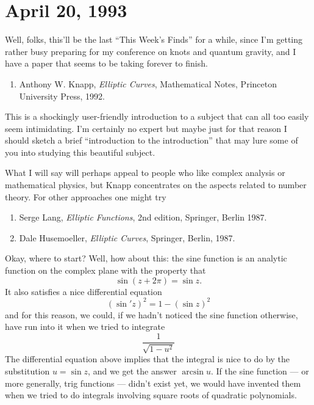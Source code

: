 \documentclass[12pt]{article}
\def\tightlist{}
\begin{document}
\hypertarget{week13}{%
\section{April 20, 1993}\label{week13}}

Well, folks, this'll be the last ``This Week's Finds'' for a while,
since I'm getting rather busy preparing for my conference on knots and
quantum gravity, and I have a paper that seems to be taking forever to
finish.

\begin{enumerate}
\def\labelenumi{\arabic{enumi})}
\tightlist
\item
  Anthony W. Knapp, \emph{Elliptic Curves}, Mathematical Notes,
  Princeton University Press, 1992.
\end{enumerate}

This is a shockingly user-friendly introduction to a subject that can
all too easily seem intimidating. I'm certainly no expert but maybe just
for that reason I should sketch a brief ``introduction to the
introduction'' that may lure some of you into studying this beautiful
subject.

What I will say will perhaps appeal to people who like complex analysis
or mathematical physics, but Knapp concentrates on the aspects related
to number theory. For other approaches one might try

\begin{enumerate}
\def\labelenumi{\arabic{enumi})}
\setcounter{enumi}{1}
\item
  Serge Lang, \emph{Elliptic Functions}, 2nd edition, Springer, Berlin
  1987.
\item
  Dale Husemoeller, \emph{Elliptic Curves}, Springer, Berlin, 1987.
\end{enumerate}

Okay, where to start? Well, how about this: the sine function is an
analytic function on the complex plane with the property that
\[\sin(z + 2\pi) = \sin z.\] It also satisfies a nice differential
equation \[(\sin' z)^2 = 1 -(\sin z)^2\] and for this reason, we could,
if we hadn't noticed the sine function otherwise, have run into it when
we tried to integrate
 \[\frac{1}{\sqrt{1 -u^2}}\] 
The differential equation above implies that the integral is nice to do by the
substitution \(u = \sin z\), and we get the answer \(\arcsin u\). If the
sine function --- or more generally, trig functions --- didn't exist
yet, we would have invented them when we tried to do integrals involving
square roots of quadratic polynomials.
\end{document}
